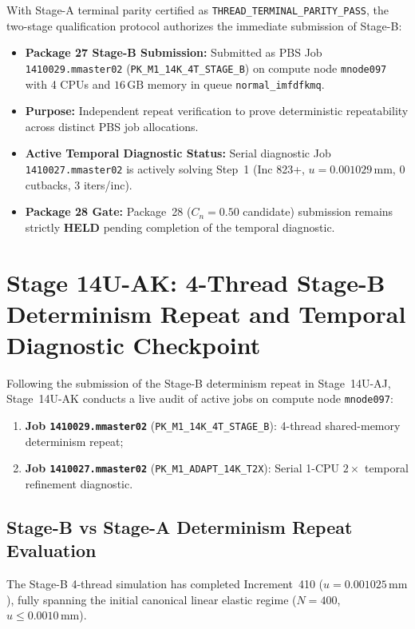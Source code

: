 With Stage-A terminal parity certified as \texttt{THREAD\_TERMINAL\_PARITY\_PASS}, the two-stage qualification protocol authorizes the immediate submission of Stage-B:
\begin{itemize}
  \item \textbf{Package 27 Stage-B Submission:} Submitted as PBS Job \texttt{1410029.mmaster02} (\texttt{PK\_M1\_14K\_4T\_STAGE\_B}) on compute node \texttt{mnode097} with 4 CPUs and $16\,\mathrm{GB}$ memory in queue \texttt{normal\_imfdfkmq}.
  \item \textbf{Purpose:} Independent repeat verification to prove deterministic repeatability across distinct PBS job allocations.
  \item \textbf{Active Temporal Diagnostic Status:} Serial diagnostic Job \texttt{1410027.mmaster02} is actively solving Step~1 (Inc 823+, $u = 0.001029\,\mathrm{mm}$, 0 cutbacks, 3 iters/inc).
  \item \textbf{Package 28 Gate:} Package~28 ($C_n = 0.50$ candidate) submission remains strictly \textbf{HELD} pending completion of the temporal diagnostic.
\end{itemize}

\section{Stage 14U-AK: 4-Thread Stage-B Determinism Repeat and Temporal Diagnostic Checkpoint}
\label{sec:stage14uak_stage_b_determinism_and_temporal_checkpoint}

Following the submission of the Stage-B determinism repeat in Stage~14U-AJ, Stage~14U-AK conducts a live audit of active jobs on compute node \texttt{mnode097}:
\begin{enumerate}
  \item \textbf{Job \texttt{1410029.mmaster02}} (\texttt{PK\_M1\_14K\_4T\_STAGE\_B}): 4-thread shared-memory determinism repeat;
  \item \textbf{Job \texttt{1410027.mmaster02}} (\texttt{PK\_M1\_ADAPT\_14K\_T2X}): Serial 1-CPU $2\times$ temporal refinement diagnostic.
\end{enumerate}

\subsection{Stage-B vs Stage-A Determinism Repeat Evaluation}
\label{subsec:stage14uak_stage_b_determinism}

The Stage-B 4-thread simulation has completed Increment~410 ($u = 0.001025\,\mathrm{mm}$), fully spanning the initial canonical linear elastic regime ($N=400$, $u \le 0.0010\,\mathrm{mm}$). 

